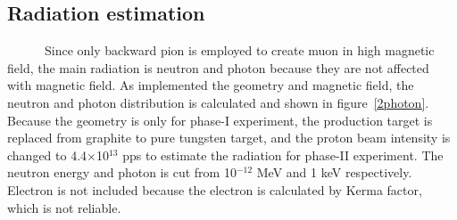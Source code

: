   \subsection{Radiation estimation}
~~~~~~Since only backward pion is employed to create muon in high magnetic field, the main radiation is neutron and photon because they are not affected with magnetic field.
As implemented the geometry and magnetic field, the neutron and photon distribution is calculated and shown in figure~\ref{2photon}.
Because the geometry is only for phase-I experiment, the production target is replaced from graphite to pure tungsten target, and the proton beam intensity is changed to 4.4$\times$10$^{13}$ pps to estimate the radiation for phase-II experiment.
The neutron energy and photon is cut from 10$^{-12}$ MeV and 1 keV respectively.
Electron is not included because the electron is calculated by Kerma factor, which is not reliable.

